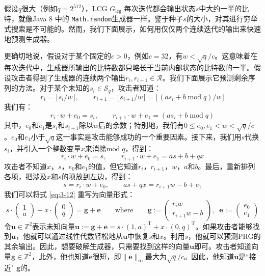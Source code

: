 \begin{snote}[密码分析。]
假设$q$很大（例如$q=2^{512}$），LCG $G_\mathrm{lcg}$ 每次迭代都会输出状态$s$中大约一半的比特，就像Java 8 中的 \texttt{Math.random}生成器一样。鉴于种子$s$的大小，对其进行穷举式搜索是不可能的。然而，我们下面展示，如何用仅仅两个连续迭代的输出来快速地预测生成器。

更确切地说，假设对于某个固定的$c>0$，例如$c=32$，有$w<\sqrt{q}/c$。这意味着在每次迭代中，生成器所输出的比特数都只略长于当前内部状态的比特数的一半。假设攻击者得到了生成器的连续两个输出$r_i,r_{i+1}\in\mathcal{R}$。我们下面展示它预测剩余序列的方法。对于某个未知的$s_i\in\mathcal{S}_q$，攻击者知道：
\[
r_i=\lfloor s_i/w\rfloor,\quad\quad
r_{i+1}=\lfloor s_{i+1}/w\rfloor=\lfloor(as_i+b\;\mathrm{mod}\;q)/w\rfloor
\]
我们有：
\[
r_i\cdot w+e_0=s_i,\quad\quad
r_{i+1}\cdot w+e_1=(as_i+b\;\mathrm{mod}\;q)
\]
其中，$e_0$和$e_1$是$s_i$和$s_{i+1}$除以$w$后的余数；特别地，我们有$0\leq e_0,e_1<w<\sqrt{q}/c$。$e_0$和$e_1$小于$\sqrt{q}$这一事实是攻击能够成功的一个重要因素。接下来，我们用$s$代换$s_i$，并引入一个整数变量$x$来消除$\mathrm{mod}\;q$，得到：
\[
r_i\cdot w+e_0=s,\quad\quad
r_{i+1}\cdot w+e_1=as+b+qx
\]
攻击者不知道$x$，$s$，$e_0$和$e_1$的值，但它知道$r_i$，$r_{i+1}$，$w$，$a$和$b$。最后，重新排列各项，把涉及$x$和$s$的项放到左边，得到：
\begin{equation}\label{eq:3-12}
s=r_i\cdot w+e_0,\quad\quad
as+qx=r_{i+1}w-b+e_1
\end{equation}
我们可以将式 \ref{eq:3-12} 重写为向量形式：
\begin{equation}
s\cdot
\begin{pmatrix}
1\\a
\end{pmatrix}
+x\cdot
\begin{pmatrix}
0\\q
\end{pmatrix}
=\boldsymbol{g}+\boldsymbol{e}
\quad\quad\text{where}\quad\quad
\boldsymbol{g}:=
\begin{pmatrix}
r_iw\\r_{i+1}w-b
\end{pmatrix}
,\;\;
\boldsymbol{e}:=
\begin{pmatrix}
e_0\\e_1
\end{pmatrix}
\end{equation}
令$\boldsymbol{u}\in\mathbb{Z}^2$表示未知向量$\boldsymbol{u}:=\boldsymbol{g}+\boldsymbol{e}=s\cdot(1,a)^\mathrm{T}+x\cdot(0,q)^\mathrm{T}$。如果攻击者能够找到$\boldsymbol{u}$，他就可以通过线性代数轻松地从$\boldsymbol{u}$中恢复$s$和$x$。利用$s$，他就可以预测PRG的其余输出。因此，想要破解生成器，只需要找到这样的向量$\boldsymbol{u}$即可。攻击者知道向量$\boldsymbol{g}\in\mathbb{Z}^2$，此外，他也知道$\boldsymbol{e}$很短，即$\lVert\boldsymbol{e}\rVert_\infty$最大为$\sqrt{q}/c$。因此，他知道$\boldsymbol{u}$是``接近" $\boldsymbol{g}$的。


\end{snote}

